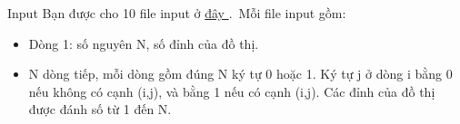 Input
Bạn được cho 10 file input ở \href{https://www.dropbox.com/s/rsc403hk54lye08/VMCOUNT.zip?dl=0}{ đây } . Mỗi file input gồm:
\begin{itemize}
	\item Dòng 1: số nguyên N, số đỉnh của đồ thị.
	\item N dòng tiếp, mỗi dòng gồm đúng N ký tự 0 hoặc 1. Ký tự j ở dòng i bằng 0 nếu không có cạnh (i,j), và bằng 1 nếu có cạnh (i,j). Các đỉnh của đồ thị được đánh số từ 1 đến N.
\end{itemize}